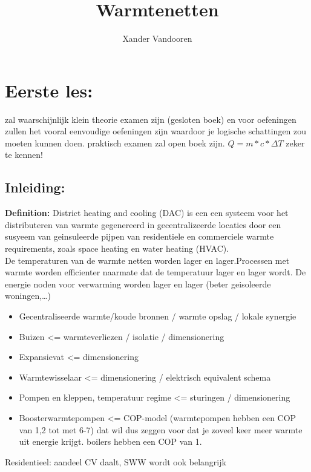 \documentclass[12pt]{article}
\begin{document}
\begin{titlepage}
    \author{Xander Vandooren}
    \title{Warmtenetten}
\end{titlepage}
\maketitle
\newpage
\tableofcontents
\newpage
{}
\section{Eerste les:}
zal waarschijnlijk klein theorie examen zijn (gesloten boek) en voor oefeningen zullen het vooral eenvoudige oefeningen zijn waardoor je logische schattingen zou moeten kunnen doen. praktisch examen zal open boek zijn. $Q=m*c*\Delta T$ zeker te kennen!
\subsection{Inleiding:}
\textbf{Definition:} District heating and cooling (DAC) is een een systeem voor het distributeren van warmte gegenereerd in gecentralizeerde locaties door een susyeem van geinsuleerde pijpen van residentiele en commerciele warmte requirements, zoals space heating en water heating (HVAC).\bigskip \\
De temperaturen van de warmte netten worden lager en lager.Processen met warmte worden efficienter naarmate dat de temperatuur lager en lager wordt. De energie noden voor verwarming worden lager en lager (beter geisoleerde woningen,\dots)
\begin{itemize}
    \item Gecentraliseerde warmte/koude bronnen / warmte opslag / lokale synergie 
    \item Buizen <= warmteverliezen / isolatie / dimensionering 
    \item Expansievat <= dimensionering 
    \item Warmtewisselaar <= dimensionering / elektrisch equivalent schema 
    \item Pompen en kleppen, temperatuur regime <= sturingen / dimensionering 
    \item Boosterwarmtepompen <= COP-model (warmtepompen hebben een COP van 1,2 tot met 6-7) dat wil dus zeggen voor dat je zoveel keer meer warmte uit energie krijgt. boilers hebben een COP van 1.
\end{itemize}
Residentieel: aandeel CV daalt, SWW wordt ook belangrijk\\
\end{document}
